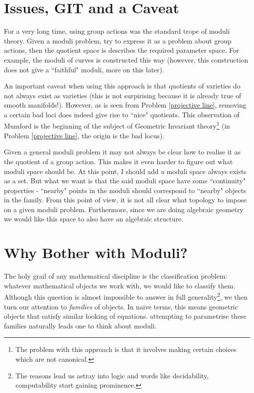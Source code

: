 \documentclass[11pt]{amsart}
\theoremstyle{definition}
\begin{document}
\section{Issues, GIT and a Caveat}

For a very long time, using group actions was the standard trope of moduli theory. Given a moduli problem, try to express it as a problem about group actions, then the quotient space is describes the required parameter space. For example, the moduli of curves is constructed this way (however, this construction does not give a ``faithful" moduli, more on this later).

An important caveat when using this approach is that quotients of varieties do not always exist as varieties (this is not surpirising because it is already true of smooth manifolds!). However, as is seen from Problem \ref{projective line}, removing a certain bad loci does indeed give rise to ``nice" quotients. This observation of Mumford is the beginning of the subject of Geometric Invariant theory\footnote{The problem with this approach is that it involves making certain choices which are not canonical.} (in Problem \ref{projective line}, the origin is the bad locus).

Given a general moduli problem it may not always be clear how to realise it as the quotient of a group action. This makes it even harder to figure out what moduli space should be. At this point, I should add \textit{a} moduli space always exists as a set. But what we want is that the said moduli space have some ``continuity" properties - ``nearby" points in the moduli should correspond to ``nearby" objects in the family. From this point of view, it is not all clear what topology to impose on a given moduli problem. Furthermore, since we are doing algebraic geometry we would like this space to also have an algebraic structure.

\section{Why Bother with Moduli?}

The holy grail of any mathematical discipline is the classification problem: whatever mathematical objects we work with, we would like to classify them. Although this question is almost impossible to answer in full generality\footnote{The reasons lead us astray into logic and words like decidability, computability start gaining prominence.}, we then turn our attention to \textit{families} of objects. In naive terms, this means geometric objects that satisfy similar looking of equations. attempting to parametrise these families naturally leads one to think about moduli.
\end{document}
